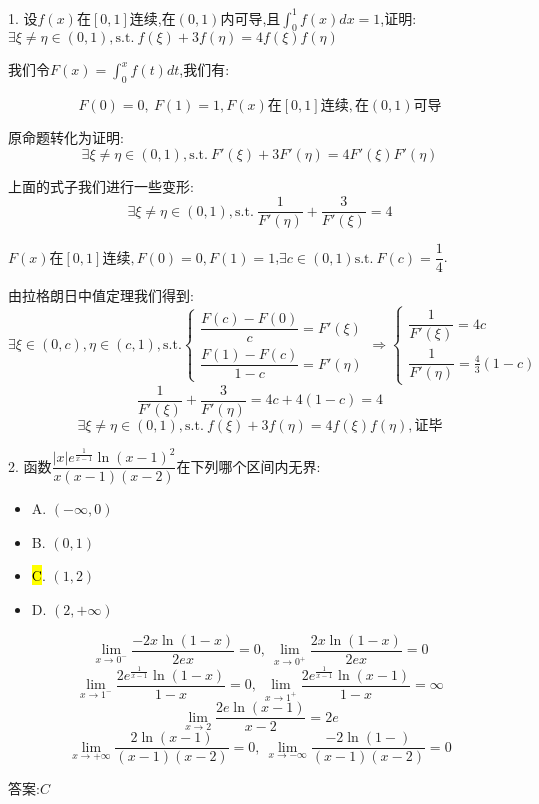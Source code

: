 1. 设$f(x)$在$[0,1]$连续,在$(0,1)$内可导,且$\int_{0}^{1}f(x)dx=1$,证明: $\exists \xi\neq \eta\in(0,1),\text{s.t.}\ f(\xi)+3f(\eta)=4f(\xi)f(\eta)$
\begin{solution}
	
	我们令$F(x)=\int_{0}^{x}f(t)dt$,我们有: 
	
	$$F(0)=0,\ F(1)=1,F(x)\text{在}[0,1]\text{连续},\text{在}(0,1)\text{可导}$$
	
	原命题转化为证明: 
	$$\exists \xi\neq \eta\in(0,1),\text{s.t.}\ F'(\xi)+3F'(\eta)=4F'(\xi)F'(\eta)$$
	
	上面的式子我们进行一些变形: 
	$$\exists \xi\neq \eta\in(0,1),\text{s.t.}\ \frac{1}{F'(\eta)}+\frac{3}{F'(\xi)}=4$$
	
	$F(x)\text{在}[0,1]\text{连续},F(0)=0,F(1)=1$,$\exists c\in(0,1)\text{s.t.}\ F(c)=\dfrac{1}{4}$.
	
	由拉格朗日中值定理我们得到: 
	$$\exists\xi\in(0,c),\eta\in(c,1), \text{s.t.}\left\lbrace 
	\begin{array}{l}
		\dfrac{F(c)-F(0)}{c}=F'(\xi)\\
		\dfrac{F(1)-F(c)}{1-c}=F'(\eta)
	\end{array}
	\right. \Rightarrow \left\lbrace 
	\begin{array}{l}
		\dfrac{1}{F'(\xi)}=4c\\
		\dfrac{1}{F'(\eta)}=\frac{4}{3}(1-c)
	\end{array}
	\right. $$
	$$\frac{1}{F'(\xi)}+\frac{3}{F'(\eta)}=4c+4(1-c)=4$$
	$$\exists \xi\neq \eta\in(0,1),\text{s.t.}\ f(\xi)+3f(\eta)=4f(\xi)f(\eta),\text{证毕}$$
\end{solution}


2. 函数$\dfrac{|x|e^{\frac{1}{x-1}}\ln(x-1)^2}{x(x-1)(x-2)}$在下列哪个区间内无界: 
\begin{itemize}
	\item A. $(-\infty,0)$ 
	\item B. $(0,1)$ 
	\item \hl{C}. $(1,2)$ 
	\item D. $(2,+\infty)$ 
\end{itemize}
\begin{solution}
	$$\lim\limits_{x\rightarrow 0^{-}}\frac{-2x\ln(1-x)}{2ex}=0,\ \lim\limits_{x\rightarrow 0^{+}}\frac{2x\ln(1-x)}{2ex}=0$$
	$$\lim\limits_{x\rightarrow 1^{-}}\frac{2e^{\frac{1}{x-1}}\ln(1-x)}{1-x}=0,\ \lim\limits_{x\rightarrow 1^{+}}\frac{2e^{\frac{1}{x-1}}\ln(x-1)}{1-x}=\infty$$
	$$\lim\limits_{x\rightarrow 2}\frac{2e\ln(x-1)}{x-2}=2e$$
	$$\lim\limits_{x\rightarrow +\infty}\frac{2\ln(x-1)}{(x-1)(x-2)}=0,\ \lim\limits_{x\rightarrow -\infty}\frac{-2\ln(1-)}{(x-1)(x-2)}=0$$
	
	答案:$C$
\end{solution}

